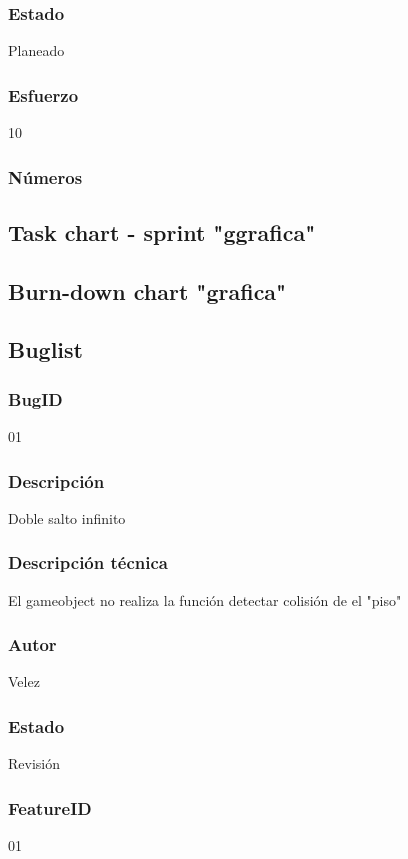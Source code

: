 \subsubsection{Estado}
Planeado
\subsubsection{Esfuerzo}
10
\subsubsection{Números}



\subsection{Task chart - sprint "ggrafica"}



\subsection{Burn-down chart "grafica"}


\subsection{Buglist}
\subsubsection{BugID}
01
\subsubsection{Descripción}
Doble salto infinito
\subsubsection{Descripción técnica}
El gameobject no realiza la función detectar colisión de el "piso" 
\subsubsection{Autor}
Velez
\subsubsection{Estado}
Revisión
\subsubsection{FeatureID}
01


